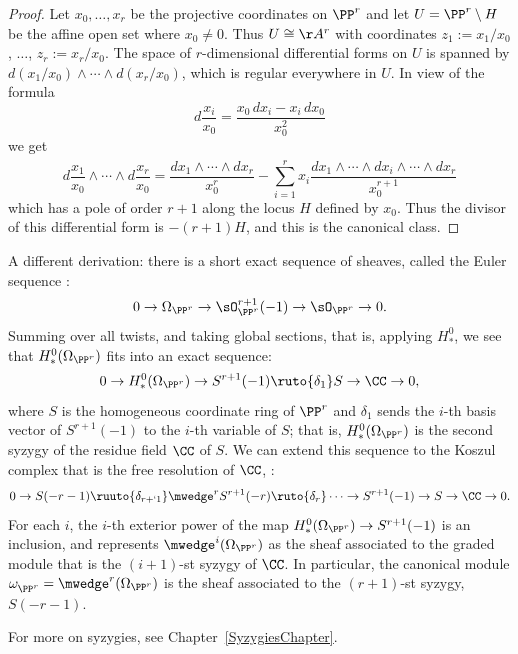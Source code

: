 \begin{proof}
Let $x_{0}, \dots, x_{r}$ be the projective coordinates on $\PP^{r}$
and let  $U = \PP^{r}\setminus H$ be the affine open set where $x_{0}
\neq 0$. Thus $U \cong \AA^{r}$ with coordinates $z_{1} :=
x_{1}/x_{0}$, $\dots$, $z_{r}:=x_{r}/x_{0}$. The space of
$r$-dimensional differential forms on $U$ is spanned by
$d(x_{1}/x_{0})\wedge\cdots\wedge d(x_{r}/x_{0})$, which is regular
everywhere in $U$. In view of the formula
$$
d\frac{x_{i}}{x_{0}} = \frac{x_{0}\,dx_{i}-x_{i}\,dx_{0}}{x_{0}^{2}}
$$
we get
$$
d\frac{x_1}{x_0}\wedge\cdots\wedge 
d\frac{x_r}{x_0}
= \frac{dx_{1}\wedge\cdots\wedge dx_{r}}{x_{0}^{r}}-
\sum_{i=1}^{r} x_{i} \frac{ dx_{1}\wedge\cdots \wedge \widehat{dx_{i}}\wedge \cdots \wedge dx_{r}}{x_{0}^{r+1}}
$$
which has a pole of order $r+1$ along the locus $H$ defined by $x_{0}$. Thus the divisor of this differential form
is $-(r+1)H$, and this is the canonical class.
\end{proof}

\begin{fact}
A different derivation: there is a short exact sequence of sheaves,
%
called the Euler sequence \cite[II.8]{Hartshorne1977}:
$$
0\to \Omega_{\PP^{r}} \to \sO_{\PP^{r}}^{r+1} (-1) \to \sO_{\PP^{r}} \to 0.
$$
Summing over all twists, and taking global sections, that is, applying $H^0_*$, we see that 
$H^0_*(\Omega_{\PP^{r}})$ fits into an exact sequence:
$$
0 \to H^0_*(\Omega_{\PP^{r}}) \to S^{r+1}(-1) \ruto{\delta_{1}} S \to \CC \to 0,
$$
where $S$ is the homogeneous coordinate ring of $\PP^r$ and $\delta_1$ sends the $i$-th basis vector of
$S^{r+1}(-1)$ to the $i$-th variable of $S$; that is, $H^0_*(\Omega_{\PP^{r}})$ is the second syzygy of the residue field $\CC$ of $S$. We can extend this sequence to the Koszul complex that is the free resolution
of $\CC$, 
%
\cite[\S17.5]{Eisenbud1995}:
$$
0 \to S(-r-1) \ruuto{\delta_{r+`1}} 
\mwedge^rS^{r+1}(-r) \ruto{\delta_{r}} \cdots \to S^{r+1}(-1) \to S \to \CC \to 0.
$$
For each $i$, the $i$-th exterior power of the map $H^0_*(\Omega_{\PP^{r}}) \to S^{r+1}(-1)$ is an inclusion, and
represents $\mwedge^i(\Omega_{\PP^{r}})$ as the sheaf associated to the graded module that is the $(i+1)$-st syzygy of $\CC$.
In particular, the canonical module $\omega^{}_{\PP^r} = \mwedge^r(\Omega_{\PP^{r}})$ is the sheaf associated to the 
$(r+1)$-st syzygy, $S(-r-1)$.

For more on syzygies, see Chapter~\ref{SyzygiesChapter}.
\end{fact}

